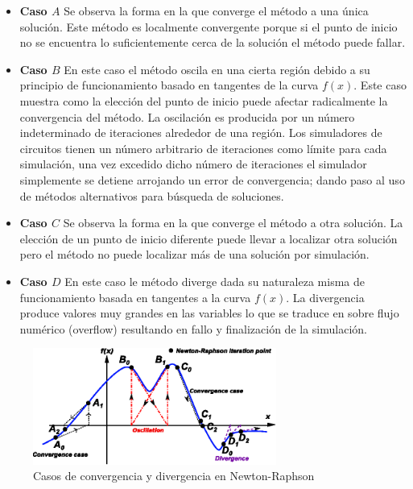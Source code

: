 \documentclass[conference,letterpaper,onecolumn]{IEEEtran}
\begin{document}
\begin{itemize}
\item {\bf Caso $A$}  Se observa la forma en la que converge el m\'etodo a una \'unica soluci\'on. Este m\'etodo  es localmente convergente \cite{Schwa_book} porque si el punto de inicio no se encuentra lo suficientemente cerca de la soluci\'on el m\'etodo puede fallar.

\item {\bf Caso $B$} En este caso el m\'etodo oscila en una cierta regi\'on debido a su principio de funcionamiento basado en tangentes de la curva $f(x)$.  Este caso muestra como la elecci\'on del punto de inicio puede afectar radicalmente la convergencia del m\'etodo. La oscilaci\'on es producida por un n\'umero indeterminado de iteraciones alrededor de una regi\'on. Los simuladores de circuitos tienen un n\'umero arbitrario de iteraciones como l{\'i}mite para cada simulaci\'on, una vez excedido dicho n\'umero de iteraciones el simulador simplemente se detiene arrojando un error de convergencia; dando paso al uso de m\'etodos alternativos para b\'usqueda de soluciones.

\item {\bf Caso  $C$} Se observa la forma en la que converge el m\'etodo a otra soluci\'on. La elecci\'on de un punto de inicio diferente puede llevar a localizar otra soluci\'on pero el m\'etodo no puede localizar m\'as de una soluci\'on por simulaci\'on.

\item {\bf Caso  $D$} En este caso le m\'etodo diverge dada su naturaleza misma de funcionamiento basada en tangentes a la curva $f(x)$. La divergencia produce valores  muy grandes en las variables lo que se traduce en sobre flujo num\'erico (overflow) resultando en fallo y finalizaci\'on de la simulaci\'on. 
\end{itemize}
\begin{figure}[hbtp]
\centering
\includegraphics[width=8cm]{figs/divergencia.eps}
\caption{Casos de convergencia y divergencia en Newton-Raphson}
\label{NRG}
\end{figure}
\end{document}
